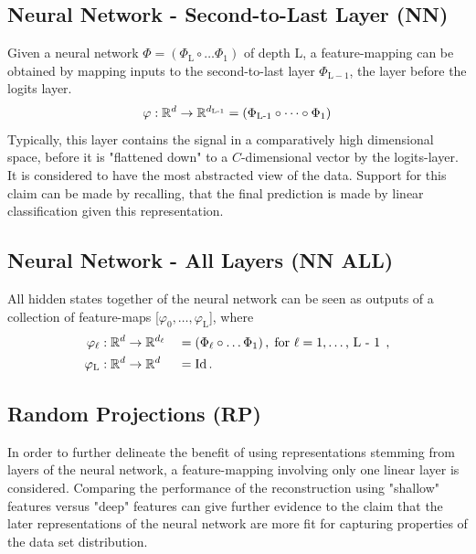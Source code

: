 \subsection{Neural Network - Second-to-Last Layer (NN)}

Given a neural network $\Phi = (\Phi_\text{L} \circ \dots \Phi_1)$ of depth L,
a feature-mapping can be obtained by mapping inputs to the second-to-last layer $\Phi_{\text{L}-1}$, 
the layer before the logits layer.
\[
    \varphi : \mathbb{R}^d \to \mathbb{R}^{d_\textnormal{L-1}} = (\Phi_\textnormal{L-1} \circ \dots \circ \Phi_1)
\]
Typically, this layer contains the signal in a comparatively high dimensional space, 
before it is "flattened down" to a $C$-dimensional vector by the logits-layer.
It is considered to have the most abstracted view of the data.
Support for this claim can be made by recalling, 
that the final prediction is made by linear classification given this representation.


\subsection{Neural Network - All Layers (NN ALL)}

All hidden states together of the neural network can be seen as outputs of a collection of feature-maps [$\varphi_0, \dots, \varphi_\text{L}$], where
\begin{alignat*}{2}
    \varphi_\ell &: \mathbb{R}^d \to \mathbb{R}^{d_\ell} &&= (\Phi_\ell \circ \dots \Phi_1)
    \,, \; \text{for $\ell = 1, \dots$, L - 1} \;  \,, \\
    \varphi_\textnormal{L} &: \mathbb{R}^d \to \mathbb{R}^d &&= \textnormal{Id} \,.
\end{alignat*}





\subsection{Random Projections (RP)}
In order to further delineate the benefit
of using representations stemming from
layers of the neural network,
a feature-mapping involving only one linear layer is considered.
Comparing the performance of the reconstruction using "shallow" features 
versus "deep" features can give further evidence
to the claim that the later representations of the neural network
are more fit for capturing properties of the data set distribution.

